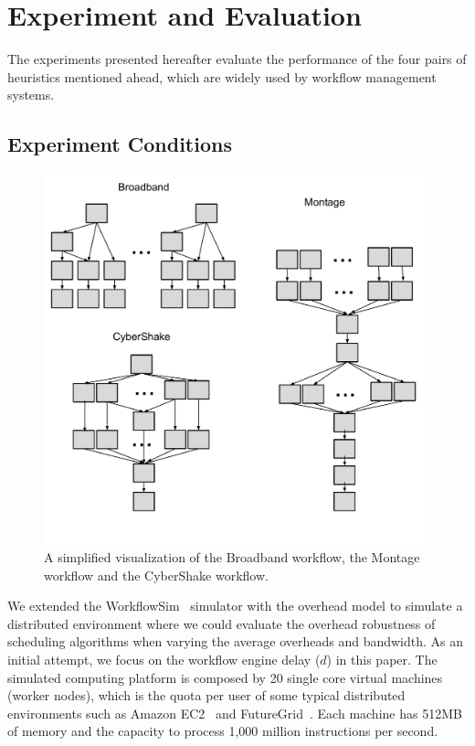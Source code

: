 \documentclass[final]{IEEEtran}
\begin{document}
\section{Experiment and Evaluation}
\label{sec:experiments}

The experiments presented hereafter evaluate the performance of the four pairs of heuristics mentioned ahead, which are widely used by workflow management systems. 

\subsection{Experiment Conditions}


\begin{figure}[htb]
	\centering
	\includegraphics[width=1.0\linewidth]{figure/shape.pdf} 
	\caption{A simplified visualization of the Broadband workflow, the Montage workflow and the CyberShake workflow.}
	\label{fig:shape}
	\vspace{-10pt}
\end{figure}

We extended the WorkflowSim~\cite{WorkflowSim} simulator with the overhead model to simulate a distributed environment where we could evaluate the overhead robustness of scheduling algorithms when varying the average overheads and bandwidth. As an initial attempt, we focus on the workflow engine delay ($d$) in this paper. The simulated computing platform is composed by 20 single core virtual machines (worker nodes), which is the quota per user of some typical distributed environments such as Amazon EC2~\cite{AmazonAWS} and FutureGrid~\cite{FutureGrid}. Each machine has 512MB of memory and the capacity to process 1,000 million instructions per second. 
\end{document}
